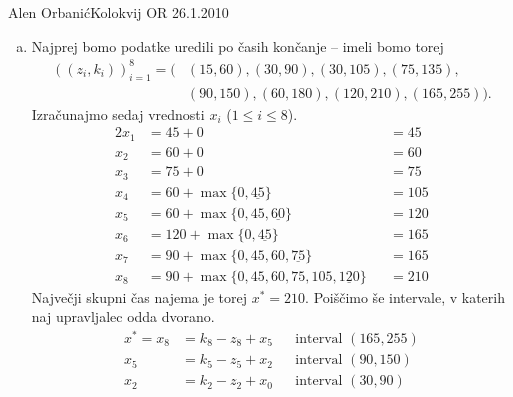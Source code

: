 \begin{naloga}{Alen Orbanić}{Kolokvij OR 26.1.2010}
\begin{odgovor}
\begin{enumerate}[(a)]
\item Najprej bomo podatke uredili po časih končanje
-- imeli bomo torej
\begin{align*}
((z_i, k_i))_{i=1}^8 = (&{} (15, 60), (30, 90), (30, 105), (75, 135), \\
&{} (90, 150), (60, 180), (120, 210), (165, 255)) .
\end{align*}
Izračunajmo sedaj vrednosti $x_i$ ($1 \le i \le 8$).
\begin{alignat*}{2}
x_1 &= 45 + 0 &&= 45 \\
x_2 &= 60 + 0 &&= 60 \\
x_3 &= 75 + 0 &&= 75 \\
x_4 &= 60 + \max\{0, \underline{45}\} &&= 105 \\
x_5 &= 60 + \max\{0, 45, \underline{60}\} &&= 120 \\
x_6 &= 120 + \max\{0, \underline{45}\} &&= 165 \\
x_7 &= 90 + \max\{0, 45, 60, \underline{75}\} &&= 165 \\
x_8 &= 90 + \max\{0, 45, 60, 75, 105, \underline{120}\} &&= 210
\end{alignat*}
Največji skupni čas najema je torej $x^* = 210$.
Poiščimo še intervale, v katerih naj upravljalec odda dvorano.
\begin{align*}
x^* = x_8 &= k_8-z_8 + x_5 && \text{interval $(165, 255)$} \\
	  x_5 &= k_5-z_5 + x_2 && \text{interval $(90, 150)$} \\
	  x_2 &= k_2-z_2 + x_0 && \text{interval $(30, 90)$} \\
\end{align*}
\end{enumerate}
\end{odgovor}
\end{naloga}
